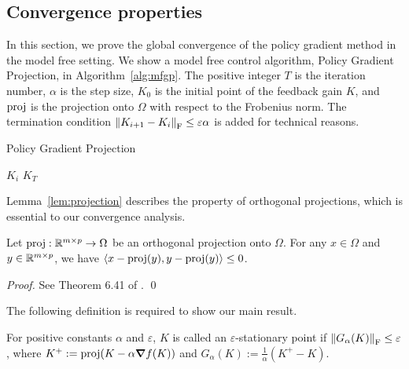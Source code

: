 \subsection{Convergence properties}\label{sec:mfgp}
In this section, we prove the global convergence of the policy gradient method in the model free setting.
We show a model free control algorithm, Policy Gradient Projection, in Algorithm~\ref{alg:mfgp}.
The positive integer $T$ is the iteration number, $\alpha$ is the step size, $K_0$ is the initial point of the feedback gain $K$,
and $\operatorname{proj}$ is the projection onto $\Omega$ with respect to the Frobenius norm.
The termination condition $\norm{K_{i+1}-K_i}_\mathrm{F}\leq \varepsilon\alpha$ is added for technical reasons.
\begin{algorithm}
  \caption{Policy Gradient Projection}
  \label{alg:mfgp}
  \begin{algorithmic}[1]
    \RETURN $K_i$
    \ENDIF
    \ENDFOR
    \RETURN $K_T$
  \end{algorithmic}
\end{algorithm}

Lemma~\ref{lem:projection} describes the property of orthogonal projections,
which is essential to our convergence analysis.
\begin{lemma}
  \label{lem:projection}
  Let $\operatorname{proj}:\mathbb{R}^{m\times p}\to \Omega$ be an orthogonal projection onto $\Omega$.
  For any $x\in \Omega$ and $y\in \mathbb{R}^{m\times p}$, we have
  $\q<x-\proj(y), y-\proj(y)>  \leq 0$.
\end{lemma}
\begin{proof}
  See Theorem 6.41 of \cite{beck2017first}. \qed
\end{proof}

The following definition is required to show our main result.
\begin{definition}
  \label{def:epsst}
  For positive constants $\alpha$ and $\varepsilon$,
  $K$ is called an $\varepsilon$-stationary point if $\norm{G_\alpha(K)}_\mathrm{F} \leq \varepsilon$, where $K^+ := \operatorname{proj}(K-\alpha\grad f(K))$ and $G_\alpha(K) := \frac{1}{\alpha}(K^+-K)$.
\end{definition}

